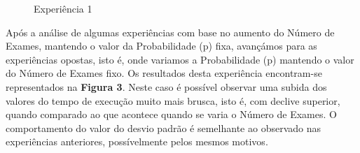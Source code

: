 \documentclass{article}
\begin{document}
\begin{figure} [!htbp]
    \centering
    \qquad
    \caption{Experiência 1}%
    \label{fig:example}%
\end{figure}

Após a análise de algumas experiências com base no aumento do Número de Exames, mantendo o valor da Probabilidade (p) fixa, avançámos para as experiências opostas, isto é, onde variamos a Probabilidade (p) mantendo o valor do Número de Exames fixo. Os resultados desta experiência encontram-se representados na \textbf{Figura 3}. Neste caso é possível observar uma subida dos valores do tempo de execução muito mais brusca, isto é, com declive superior, quando comparado ao que acontece quando se varia o Número de Exames. O comportamento do valor do desvio padrão é semelhante ao observado nas experiências anteriores, possívelmente pelos mesmos motivos.
\end{document}
